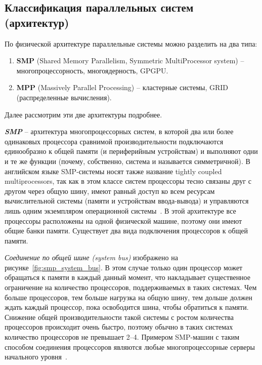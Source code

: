 \subsection{Классификация параллельных систем (архитектур)}
\label{subsec:architecture-classification}

По физической архитектуре параллельные системы можно разделить на два типа:

\begin{enumerate}
    \item\textbf{SMP} (Shared Memory Parallelism, Symmetric MultiProcessor system) -- многопроцессорность, многоядерность, GPGPU\@. 
    \item\textbf{MPP} (Massively Parallel Processing) -- кластерные системы, GRID (распределенные вычисления).
\end{enumerate}

Далее рассмотрим эти две архитектуры подробнее.

\textbf{\textit{SMP}} -- архитектура многопроцессорных систем, в которой два или более одинаковых процессора сравнимой производительности подключаются единообразно к общей памяти (и периферийным устройствам) и выполняют одни и те же функции (почему, собственно, система и называется симметричной).
В английском языке SMP-системы носят также название tightly coupled multiprocessors, так как в этом классе систем процессоры тесно связаны друг с другом через общую шину, имеют равный доступ ко всем ресурсам вычислительной системы (памяти и устройствам ввода-вывода) и управляются лишь одним экземпляром операционной системы~\cite{SymmetricMultiprocessingWP}.
В этой архитектуре все процессоры расположены на одной физической машине, поэтому они имеют общие банки памяти.
Существует два вида подключения процессоров к общей памяти.

\textit{Соединение по общей шине (system bus)} изображено на рисунке~\ref{fig:smp_system_bus}.
В этом случае только один процессор может обращаться к памяти в каждый данный момент, что накладывает существенное ограничение на количество процессоров, поддерживаемых в таких системах.
Чем больше процессоров, тем больше нагрузка на общую шину, тем дольше должен ждать каждый процессор, пока освободится шина, чтобы обратиться к памяти.
Снижение общей производительности такой системы с ростом количества процессоров происходит очень быстро, поэтому обычно в таких системах количество процессоров не превышает 2--4.
Примером SMP-машин с таким способом соединения процессоров являются любые многопроцессорные серверы начального уровня~\cite{Martyshkin2014}.

